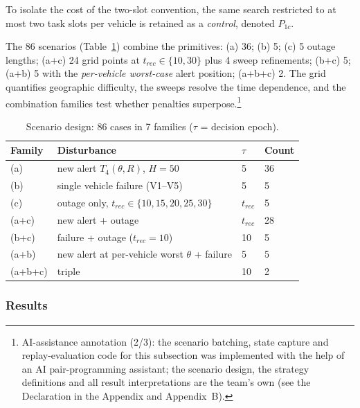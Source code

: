 To isolate the cost of the two-slot convention, the same search restricted to at most
two task slots per vehicle is retained as a \emph{control}, denoted $P_{1c}$.

The 86 scenarios (Table~\ref{tab:q4design}) combine the primitives: (a) 36; (b) 5; (c) 5
outage lengths; (a+c) 24 grid points at $t_{rec}\in\{10,30\}$ plus 4 sweep refinements;
(b+c) 5; (a+b) 5 with the \emph{per-vehicle worst-case} alert position; (a+b+c) 2. The
grid quantifies geographic difficulty, the sweeps resolve the time dependence, and the
combination families test whether penalties superpose.\footnote{AI-assistance
annotation (2/3): the scenario batching, state capture and replay-evaluation code for
this subsection was implemented with the help of an AI pair-programming assistant; the
scenario design, the strategy definitions and all result interpretations are the
team's own (see the Declaration in the Appendix and Appendix~B).}

\begin{table}[!htb]\centering
\caption{Scenario design: 86 cases in 7 families ($\tau$ = decision epoch).}
\label{tab:q4design}
\begin{tabular}{llll}
\toprule
Family & Disturbance & $\tau$ & Count \\
\midrule
(a)  & new alert $T_4(\theta,R)$, $H=50$          & 5           & 36 \\
(b)  & single vehicle failure (V1--V5)            & 5           & 5  \\
(c)  & outage only, $t_{rec}\in\{10,15,20,25,30\}$& $t_{rec}$   & 5  \\
(a+c)& new alert + outage                         & $t_{rec}$   & 28 \\
(b+c)& failure + outage ($t_{rec}=10$)            & 10          & 5  \\
(a+b)& new alert at per-vehicle worst $\theta$ + failure & 5    & 5  \\
(a+b+c)& triple                                  & 10          & 2  \\
\bottomrule
\end{tabular}
\end{table}

\subsubsection{Results}

